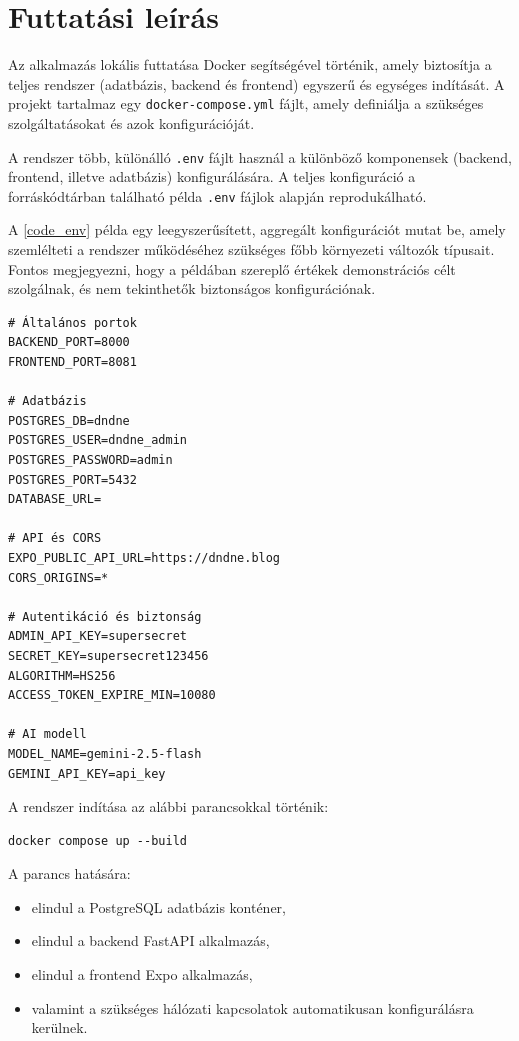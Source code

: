 \documentclass[
]{thesis-ekf}
\theoremstyle{definition}
\theoremstyle{remark}
\begin{document}
\section{Futtatási leírás}

Az alkalmazás lokális futtatása Docker segítségével történik, amely biztosítja a teljes rendszer (adatbázis, backend és frontend) egyszerű és egységes indítását. A projekt tartalmaz egy \texttt{docker-compose.yml} fájlt, amely definiálja a szükséges szolgáltatásokat és azok konfigurációját.

A rendszer több, különálló \texttt{.env} fájlt használ a különböző komponensek (backend, frontend, illetve adatbázis) konfigurálására. A teljes konfiguráció a forráskódtárban található példa \texttt{.env} fájlok alapján reprodukálható.

A \ref{code_env} példa egy leegyszerűsített, aggregált konfigurációt mutat be, amely szemlélteti a rendszer működéséhez szükséges főbb környezeti változók típusait. Fontos megjegyezni, hogy a példában szereplő értékek demonstrációs célt szolgálnak, és nem tekinthetők biztonságos konfigurációnak.

\begin{lstlisting}[style=textstyle, caption={Példa .env konfiguráció}, label={code_env}]
# Általános portok
BACKEND_PORT=8000
FRONTEND_PORT=8081

# Adatbázis
POSTGRES_DB=dndne
POSTGRES_USER=dndne_admin
POSTGRES_PASSWORD=admin
POSTGRES_PORT=5432
DATABASE_URL=

# API és CORS
EXPO_PUBLIC_API_URL=https://dndne.blog
CORS_ORIGINS=*

# Autentikáció és biztonság
ADMIN_API_KEY=supersecret
SECRET_KEY=supersecret123456
ALGORITHM=HS256
ACCESS_TOKEN_EXPIRE_MIN=10080

# AI modell
MODEL_NAME=gemini-2.5-flash
GEMINI_API_KEY=api_key
\end{lstlisting}

A rendszer indítása az alábbi parancsokkal történik:

\begin{verbatim}
docker compose up --build
\end{verbatim}

A parancs hatására:
\begin{itemize}
    \item elindul a PostgreSQL adatbázis konténer,
    \item elindul a backend FastAPI alkalmazás,
    \item elindul a frontend Expo alkalmazás,
    \item valamint a szükséges hálózati kapcsolatok automatikusan konfigurálásra kerülnek.
\end{itemize}
\end{document}
